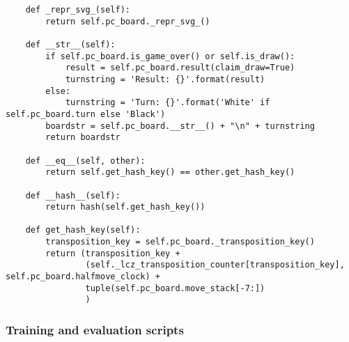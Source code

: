 \begin{verbatim}
    def _repr_svg_(self):
        return self.pc_board._repr_svg_()

    def __str__(self):
        if self.pc_board.is_game_over() or self.is_draw():
            result = self.pc_board.result(claim_draw=True)
            turnstring = 'Result: {}'.format(result)
        else:
            turnstring = 'Turn: {}'.format('White' if self.pc_board.turn else 'Black') 
        boardstr = self.pc_board.__str__() + "\n" + turnstring
        return boardstr
    
    def __eq__(self, other):
        return self.get_hash_key() == other.get_hash_key()
    
    def __hash__(self):
        return hash(self.get_hash_key())

    def get_hash_key(self):
        transposition_key = self.pc_board._transposition_key() 
        return (transposition_key +
                (self._lcz_transposition_counter[transposition_key], self.pc_board.halfmove_clock) +
                tuple(self.pc_board.move_stack[-7:])
                )
\end{verbatim}

\subsubsection{Training and evaluation scripts}

